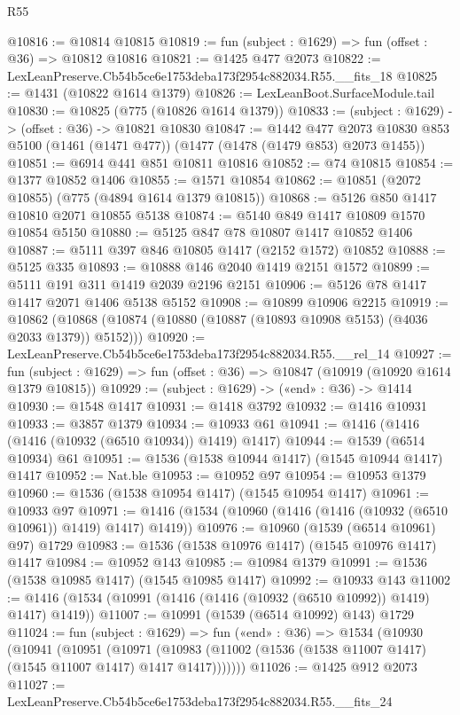 \begin{lexlean}{R55}
\begin{coremodule}
{{@10816 := @10814 @10815
@10819 := fun (subject : @1629) => fun (offset : @36) => @10812 @10816
@10821 := @1425 @477 @2073
@10822 := LexLeanPreserve.Cb54b5ce6e1753deba173f2954c882034.R55.__fits_18
@10825 := @1431 (@10822 @1614 @1379)
@10826 := LexLeanBoot.SurfaceModule.tail
@10830 := @10825 (@775 (@10826 @1614 @1379))
@10833 := (subject : @1629) -> (offset : @36) -> @10821 @10830
@10847 := @1442
    @477
    @2073
    @10830
    @853
    @5100
    (@1461 (@1471 @477))
    (@1477 (@1478 (@1479 @853) @2073 @1455))
@10851 := @6914 @441 @851 @10811 @10816
@10852 := @74 @10815
@10854 := @1377 @10852 @1406
@10855 := @1571 @10854
@10862 := @10851 (@2072 @10855) (@775 (@4894 @1614 @1379 @10815))
@10868 := @5126 @850 @1417 @10810 @2071 @10855 @5138
@10874 := @5140 @849 @1417 @10809 @1570 @10854 @5150
@10880 := @5125 @847 @78 @10807 @1417 @10852 @1406
@10887 := @5111 @397 @846 @10805 @1417 (@2152 @1572) @10852
@10888 := @5125 @335
@10893 := @10888 @146 @2040 @1419 @2151 @1572
@10899 := @5111 @191 @311 @1419 @2039 @2196 @2151
@10906 := @5126 @78 @1417 @1417 @2071 @1406 @5138 @5152
@10908 := @10899 @10906 @2215
@10919 := @10862 (@10868 (@10874 (@10880 (@10887 (@10893 @10908 @5153) (@4036 @2033 @1379)) @5152)))
@10920 := LexLeanPreserve.Cb54b5ce6e1753deba173f2954c882034.R55.__rel_14
@10927 := fun (subject : @1629) => fun (offset : @36) => @10847 (@10919 (@10920 @1614 @1379 @10815))
@10929 := (subject : @1629) -> («end» : @36) -> @1414
@10930 := @1548 @1417
@10931 := @1418 @3792
@10932 := @1416 @10931
@10933 := @3857 @1379
@10934 := @10933 @61
@10941 := @1416 (@1416 (@1416 (@10932 (@6510 @10934)) @1419) @1417)
@10944 := @1539 (@6514 @10934) @61
@10951 := @1536 (@1538 @10944 @1417) (@1545 @10944 @1417) @1417
@10952 := Nat.ble
@10953 := @10952 @97
@10954 := @10953 @1379
@10960 := @1536 (@1538 @10954 @1417) (@1545 @10954 @1417)
@10961 := @10933 @97
@10971 := @1416 (@1534 (@10960 (@1416 (@1416 (@10932 (@6510 @10961)) @1419) @1417) @1419))
@10976 := @10960 (@1539 (@6514 @10961) @97) @1729
@10983 := @1536 (@1538 @10976 @1417) (@1545 @10976 @1417) @1417
@10984 := @10952 @143
@10985 := @10984 @1379
@10991 := @1536 (@1538 @10985 @1417) (@1545 @10985 @1417)
@10992 := @10933 @143
@11002 := @1416 (@1534 (@10991 (@1416 (@1416 (@10932 (@6510 @10992)) @1419) @1417) @1419))
@11007 := @10991 (@1539 (@6514 @10992) @143) @1729
@11024 := fun (subject : @1629) =>
  fun («end» : @36) =>
  @1534
    (@10930
      (@10941
        (@10951
          (@10971
            (@10983 (@11002 (@1536 (@1538 @11007 @1417) (@1545 @11007 @1417) @1417 @1417)))))))
@11026 := @1425 @912 @2073
@11027 := LexLeanPreserve.Cb54b5ce6e1753deba173f2954c882034.R55.__fits_24
}}
\end{coremodule}
\end{lexlean}
